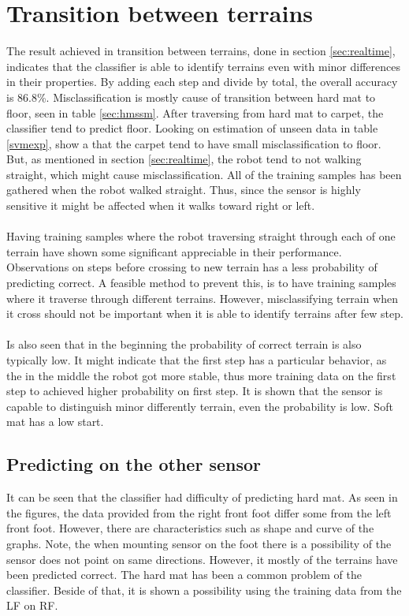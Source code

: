 \documentclass[USenglish]{ifimaster}  %
\begin{document}
\section{Transition between terrains}
The result achieved in transition between terrains, done in section \ref{sec:realtime}, indicates that the classifier is able to identify terrains even with minor differences in their properties. By adding each step and divide by total, the overall accuracy is  86.8\%. Misclassification is mostly cause of transition between hard mat to floor, seen in table \ref{sec:hmssm}. After traversing from hard mat to carpet, the classifier tend to predict floor. Looking on estimation of unseen data in table \ref{svmexp}, show a that the carpet tend to have small misclassification to floor. But, as mentioned in section \ref{sec:realtime}, the robot tend to not walking straight, which might cause misclassification. All of the training samples has been gathered when the robot walked straight. Thus, since the sensor is highly sensitive it might be affected when it walks toward right or left.
\\
\\
Having training samples where the robot traversing straight through each of one terrain have shown some significant appreciable in their performance. Observations on steps before crossing to new terrain has a less probability of predicting correct. A feasible method to prevent this, is to have training samples where it traverse through different terrains. However, misclassifying terrain when it cross should not be important when it is able to identify terrains after few step.    
\\
\\
Is also seen that in the beginning the probability of correct terrain is also typically low. It might indicate that the first step has a particular behavior, as the in the middle the robot got more stable, thus more training data on the first step to achieved higher probability on first step. It is shown that the sensor is capable to distinguish minor differently terrain, even the probability is low. Soft mat has a low start.
	
\subsection{Predicting on the other sensor}
It can be seen that the classifier had difficulty of predicting hard mat. As seen in the figures, the data provided from the right front foot differ some from the left front foot. However, there are characteristics such as shape and curve of the graphs. Note, the when mounting sensor on the foot there is a possibility of the sensor does not point on same directions. However, it mostly of the terrains have been predicted correct. The hard mat has been a common problem of the classifier. Beside of that, it is shown a possibility using the training data from the LF on RF.
	
\end{document}
